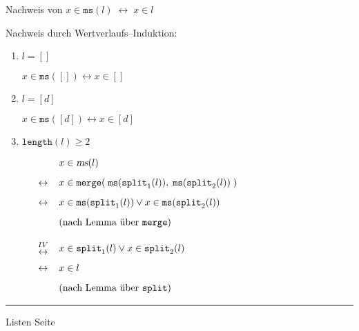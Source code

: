
\begin{slide}{}
\normalsize

\begin{center}
Nachweis von $x \in \texttt{ms}(l) \;\leftrightarrow\; x \in l$
\end{center}
\vspace*{0.5cm}

\footnotesize
Nachweis durch Wertverlaufs--Induktion:
\begin{enumerate}
\item $l = []$

      $x \in \mathtt{ms}([]) \leftrightarrow x \in []$
\item $l = [d]$

      $x \in \mathtt{ms}([d]) \leftrightarrow x \in [d]$
\item $\mathtt{length}(l) \geq 2$

      $
      \begin{array}{lcl}
      &                 & x \in \textsl{ms}(l) \\[0.3cm]
      & \leftrightarrow & x \in \mathtt{merge}(\;\mathtt{ms}(\mathtt{split}_1(l)),\; \mathtt{ms}(\mathtt{split}_2(l))\;) \\[0.3cm]
      & \leftrightarrow & x \in \mathtt{ms}(\mathtt{split}_1(l)) \vee x \in \mathtt{ms}(\mathtt{split}_2(l)) \\[0.3cm]
      &                 &   (\mbox{nach Lemma \"uber \texttt{merge}})                              \\[0.5cm]
      & {IV \atop \displaystyle\leftrightarrow} & x \in \mathtt{split}_1(l) \vee x \in \mathtt{split}_2(l) \\[0.3cm]
      & \leftrightarrow & x \in l  \\[0.3cm]
      &                 &   (\mbox{nach Lemma \"uber \texttt{split}})  
      \end{array}
      $
\end{enumerate}

\vspace*{\fill}
\tiny \addtocounter{mypage}{1}
\rule{17cm}{1mm}
Listen  \hspace*{\fill} Seite 
\end{slide}


